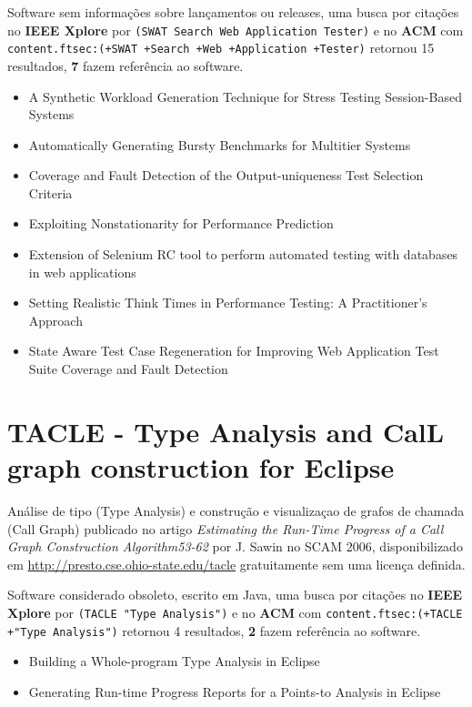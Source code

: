 Software sem informações sobre lançamentos ou releases,
uma busca por citações no {\bf IEEE Xplore} por
\texttt{(SWAT Search Web Application Tester)}
e no {\bf ACM} com
\texttt{content.ftsec:(+SWAT +Search +Web +Application +Tester)}
retornou
15 resultados,
{\bf 7} fazem referência ao software.

\begin{itemize}
\item A Synthetic Workload Generation Technique for Stress Testing Session-Based Systems
\item Automatically Generating Bursty Benchmarks for Multitier Systems
\item Coverage and Fault Detection of the Output-uniqueness Test Selection Criteria
\item Exploiting Nonstationarity for Performance Prediction
\item Extension of Selenium RC tool to perform automated testing with databases in web applications
\item Setting Realistic Think Times in Performance Testing: A Practitioner's Approach
\item State Aware Test Case Regeneration for Improving Web Application Test Suite Coverage and Fault Detection
\end{itemize}


\section{TACLE - Type Analysis and CalL graph construction for Eclipse}

Análise de tipo (Type Analysis) e construção e visualizaçao de grafos de chamada (Call Graph)
publicado no artigo {\it Estimating the Run-Time Progress of a Call Graph Construction Algorithm53-62}
por J. Sawin
no SCAM 2006,
disponibilizado em \url{http://presto.cse.ohio-state.edu/tacle}
gratuitamente
sem uma licença definida.

Software considerado obsoleto,
escrito em Java,
uma busca por citações no {\bf IEEE Xplore} por
\texttt{(TACLE "Type Analysis")}
e no {\bf ACM} com
\texttt{content.ftsec:(+TACLE +"Type Analysis")}
retornou
4 resultados,
{\bf 2} fazem referência ao software.

\begin{itemize}
\item Building a Whole-program Type Analysis in Eclipse
\item Generating Run-time Progress Reports for a Points-to Analysis in Eclipse
\end{itemize}


